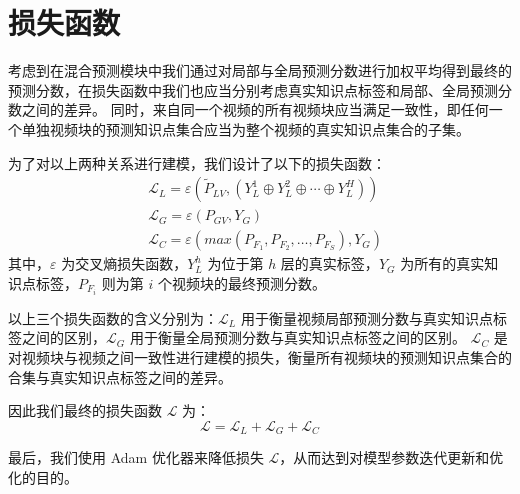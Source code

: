 \section{损失函数}
    考虑到在混合预测模块中我们通过对局部与全局预测分数进行加权平均得到最终的预测分数，在损失函数中我们也应当分别考虑真实知识点标签和局部、全局预测分数之间的差异。
    同时，来自同一个视频的所有视频块应当满足一致性，即任何一个单独视频块的预测知识点集合应当为整个视频的真实知识点集合的子集。

    为了对以上两种关系进行建模，我们设计了以下的损失函数：
    \begin{equation}
        \begin{aligned}
            &\mathcal{L}_L = \varepsilon\left(\tilde{P}_{LV}, \left(Y_L^1 \oplus Y_L^2 \oplus \cdots \oplus Y_L^H\right)\right) \\
            &\mathcal{L}_G = \varepsilon\left(P_{GV}, Y_G\right) \\
            &\mathcal{L}_C = \varepsilon\left(max\left(P_{F_1}, P_{F_2}, \dots, P_{F_S}\right), Y_G\right)
        \end{aligned}
    \end{equation}
    其中，$\varepsilon$ 为交叉熵损失函数，$Y_L^h$ 为位于第 $h$ 层的真实标签，$Y_G$ 为所有的真实知识点标签，$P_{F_i}$ 则为第 $i$ 个视频块的最终预测分数。

    以上三个损失函数的含义分别为：$\mathcal{L}_L$ 用于衡量视频局部预测分数与真实知识点标签之间的区别，$\mathcal{L}_G$ 用于衡量全局预测分数与真实知识点标签之间的区别。
    $\mathcal{L}_C$ 是对视频块与视频之间一致性进行建模的损失，衡量所有视频块的预测知识点集合的合集与真实知识点标签之间的差异。

    因此我们最终的损失函数 $\mathcal{L}$ 为：
    \begin{equation}
        \mathcal{L} = \mathcal{L}_L + \mathcal{L}_G + \mathcal{L}_C
    \end{equation}

    最后，我们使用 Adam\cite{Kingma2015AdamAM} 优化器来降低损失 $\mathcal{L}$，从而达到对模型参数迭代更新和优化的目的。
